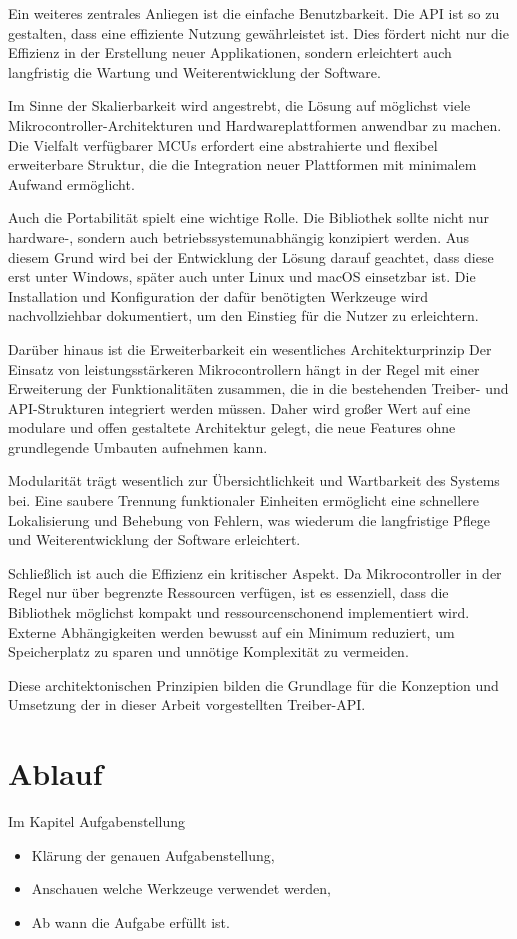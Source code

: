 Ein weiteres zentrales Anliegen ist die einfache Benutzbarkeit. 
Die API ist so zu gestalten, dass eine effiziente Nutzung gewährleistet ist. 
Dies fördert nicht nur die Effizienz in der Erstellung neuer Applikationen, sondern erleichtert auch langfristig die Wartung und Weiterentwicklung der Software.

Im Sinne der Skalierbarkeit wird angestrebt, die Lösung auf möglichst viele Mikrocontroller-Architekturen und Hardwareplattformen anwendbar zu machen.
Die Vielfalt verfügbarer MCUs erfordert eine abstrahierte und flexibel erweiterbare Struktur, die die Integration neuer Plattformen mit minimalem Aufwand ermöglicht.

Auch die Portabilität spielt eine wichtige Rolle.
Die Bibliothek sollte nicht nur hardware-, sondern auch betriebssystemunabhängig konzipiert werden.
Aus diesem Grund wird bei der Entwicklung der Lösung darauf geachtet, dass diese erst unter Windows, später auch unter Linux und macOS einsetzbar ist.
Die Installation und Konfiguration der dafür benötigten Werkzeuge wird nachvollziehbar dokumentiert, um den Einstieg für die Nutzer zu erleichtern.

Darüber hinaus ist die Erweiterbarkeit ein wesentliches Architekturprinzip
Der Einsatz von leistungsstärkeren Mikrocontrollern hängt in der Regel mit einer Erweiterung der Funktionalitäten zusammen, die in die bestehenden Treiber- und API-Strukturen integriert werden müssen.
Daher wird großer Wert auf eine modulare und offen gestaltete Architektur gelegt, die neue Features ohne grundlegende Umbauten aufnehmen kann.

Modularität trägt wesentlich zur Übersichtlichkeit und Wartbarkeit des Systems bei. 
Eine saubere Trennung funktionaler Einheiten ermöglicht eine schnellere Lokalisierung und Behebung von Fehlern, was wiederum die langfristige Pflege und Weiterentwicklung der Software erleichtert.

Schließlich ist auch die Effizienz ein kritischer Aspekt.
Da Mikrocontroller in der Regel nur über begrenzte Ressourcen verfügen, ist es essenziell, dass die Bibliothek möglichst kompakt und ressourcenschonend implementiert wird. 
Externe Abhängigkeiten werden bewusst auf ein Minimum reduziert, um Speicherplatz zu sparen und unnötige Komplexität zu vermeiden.

Diese architektonischen Prinzipien bilden die Grundlage für die Konzeption und Umsetzung der in dieser Arbeit vorgestellten Treiber-API.

\section{Ablauf}
Im Kapitel Aufgabenstellung
	\begin{itemize}
		\item Klärung der genauen Aufgabenstellung,
		\item Anschauen welche Werkzeuge verwendet werden,
		\item Ab wann die Aufgabe erfüllt ist.
	\end{itemize}
	
